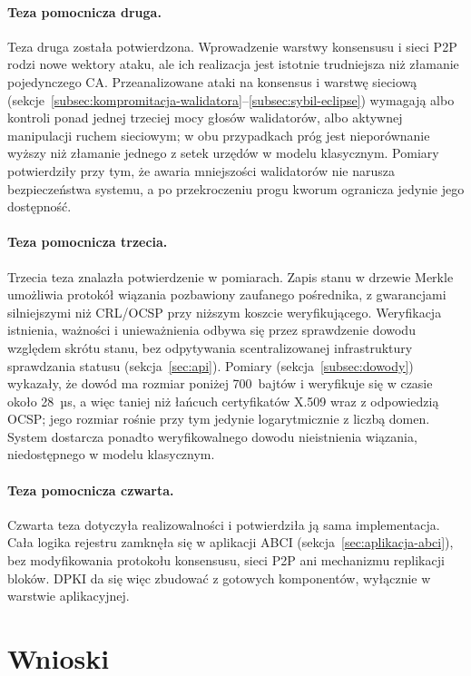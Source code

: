 \paragraph{Teza pomocnicza druga.} Teza druga została potwierdzona. Wprowadzenie warstwy konsensusu i sieci P2P rodzi nowe wektory ataku, ale ich realizacja jest istotnie trudniejsza niż złamanie pojedynczego CA. Przeanalizowane ataki na konsensus i warstwę sieciową (sekcje~\ref{subsec:kompromitacja-walidatora}--\ref{subsec:sybil-eclipse}) wymagają albo kontroli ponad jednej trzeciej mocy głosów walidatorów, albo aktywnej manipulacji ruchem sieciowym; w obu przypadkach próg jest nieporównanie wyższy niż złamanie jednego z setek urzędów w modelu klasycznym. Pomiary potwierdziły przy tym, że awaria mniejszości walidatorów nie narusza bezpieczeństwa systemu, a po przekroczeniu progu kworum ogranicza jedynie jego dostępność.

\paragraph{Teza pomocnicza trzecia.} Trzecia teza znalazła potwierdzenie w pomiarach. Zapis stanu w drzewie Merkle umożliwia protokół wiązania pozbawiony zaufanego pośrednika, z gwarancjami silniejszymi niż CRL/OCSP przy niższym koszcie weryfikującego. Weryfikacja istnienia, ważności i unieważnienia odbywa się przez sprawdzenie dowodu względem skrótu stanu, bez odpytywania scentralizowanej infrastruktury sprawdzania statusu (sekcja~\ref{sec:api}). Pomiary (sekcja~\ref{subsec:dowody}) wykazały, że dowód ma rozmiar poniżej 700~bajtów i weryfikuje się w czasie około 28~µs, a więc taniej niż łańcuch certyfikatów X.509 wraz z odpowiedzią OCSP; jego rozmiar rośnie przy tym jedynie logarytmicznie z liczbą domen. System dostarcza ponadto weryfikowalnego dowodu nieistnienia wiązania, niedostępnego w modelu klasycznym.

\paragraph{Teza pomocnicza czwarta.} Czwarta teza dotyczyła realizowalności i potwierdziła ją sama implementacja. Cała logika rejestru zamknęła się w aplikacji ABCI (sekcja~\ref{sec:aplikacja-abci}), bez modyfikowania protokołu konsensusu, sieci P2P ani mechanizmu replikacji bloków. DPKI da się więc zbudować z gotowych komponentów, wyłącznie w warstwie aplikacyjnej.

\section{Wnioski}
\label{sec:wnioski}

